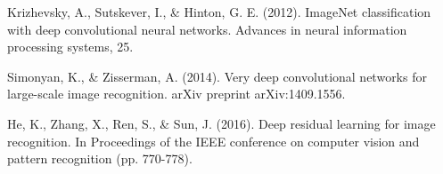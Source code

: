 \documentclass{report} %
\begin{document}
\begin{thebibliography}{9}
Krizhevsky, A., Sutskever, I., \& Hinton, G. E. (2012). ImageNet classification with deep convolutional neural networks. Advances in neural information processing systems, 25.

Simonyan, K., \& Zisserman, A. (2014). Very deep convolutional networks for large-scale image recognition. arXiv preprint arXiv:1409.1556.

He, K., Zhang, X., Ren, S., \& Sun, J. (2016). Deep residual learning for image recognition. In Proceedings of the IEEE conference on computer vision and pattern recognition (pp. 770-778).
\end{thebibliography}
\end{document}
